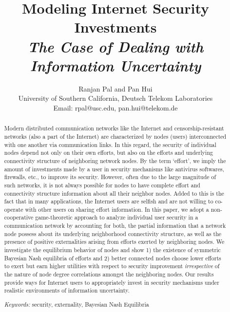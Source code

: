 \documentclass[letterpaper,12pt,onecolumn, nodraft]{IEEEtran}
\begin{document}
\title{Modeling Internet Security Investments  \\ \emph{The Case of Dealing with Information Uncertainty}}




\author{Ranjan Pal and Pan Hui\\ University of Southern California, Deutsch Telekom Laboratories\\Email: rpal@usc.edu, pan.hui@telekom.de}












\maketitle
\begin{abstract}
Modern distributed communication networks like the Internet and censorship-resistant networks  (also a part of the Internet) are characterized by nodes (users) interconnected with one another via communication links.  In this regard, the security of individual nodes depend not only on their own efforts, but also on the efforts and underlying connectivity structure of neighboring network nodes. By the term `effort', we imply the amount of investments made by a user in security mechanisms like antivirus softwares, firewalls, etc., to improve its security. However, often due to the large magnitude of such networks, it is not always possible for nodes to have complete effort and connectivity structure information about all their neighbor nodes. Added to this is the fact that in many applications, the Internet users are selfish and are not willing to co-operate with other users on sharing effort information. In this paper, we adopt a non-cooperative game-theoretic approach to analyze individual user security in a communication network by accounting for both, the partial information that a network node possess about its underlying neighborhood connectivity structure, as well as the presence of positive externalities arising from efforts exerted by neighboring nodes. We investigate the equilibrium behavior of nodes and show 1) the existence of symmetric Bayesian Nash equilibria of efforts and 2) better connected nodes choose lower efforts to exert but earn higher utilities with respect to security improvement \emph{irrespective} of the nature of node degree correlations amongst the neighboring nodes. Our results provide ways for Internet users to appropriately invest in security mechanisms under realistic environments of information uncertainty.

\emph{Keywords:}  security, externality, Bayesian Nash Equilibria
\end{abstract}
\IEEEpeerreviewmaketitle
\end{document}
